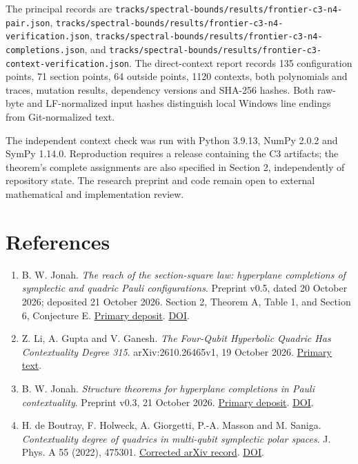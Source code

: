 \documentclass[11pt,letterpaper]{article}
\providecommand{\tightlist}{\setlength{\itemsep}{0pt}\setlength{\parskip}{0pt}}
\begin{document}
The principal records are \nolinkurl{tracks/spectral-bounds/results/frontier-c3-n4-pair.json}, \nolinkurl{tracks/spectral-bounds/results/frontier-c3-n4-verification.json}, \nolinkurl{tracks/spectral-bounds/results/frontier-c3-n4-completions.json}, and \nolinkurl{tracks/spectral-bounds/results/frontier-c3-context-verification.json}. The direct-context report records 135 configuration points, 71 section points, 64 outside points, 1120 contexts, both polynomials and traces, mutation results, dependency versions and SHA-256 hashes. Both raw-byte and LF-normalized input hashes distinguish local Windows line endings from Git-normalized text.

The independent context check was run with Python 3.9.13, NumPy 2.0.2 and SymPy 1.14.0. Reproduction requires a release containing the C3 artifacts; the theorem's complete assignments are also specified in Section 2, independently of repository state. The research preprint and code remain open to external mathematical and implementation review.

\section{References}\label{references}

\begin{enumerate}
\def\labelenumi{\arabic{enumi}.}
\tightlist
\item
  B. W. Jonah. \emph{The reach of the section-square law: hyperplane completions of symplectic and quadric Pauli configurations}. Preprint v0.5, dated 20 October 2026; deposited 21 October 2026. Section 2, Theorem A, Table 1, and Section 6, Conjecture E. \href{https://zenodo.org/records/23524332}{Primary deposit}. \href{https://doi.org/10.5281/zenodo.23524332}{DOI}.
\item
  Z. Li, A. Gupta and V. Ganesh. \emph{The Four-Qubit Hyperbolic Quadric Has Contextuality Degree 315}. arXiv:2610.26465v1, 19 October 2026. \href{https://arxiv.org/html/2610.26465v1}{Primary text}.
\item
  B. W. Jonah. \emph{Structure theorems for hyperplane completions in Pauli contextuality}. Preprint v0.3, 21 October 2026. \href{https://zenodo.org/records/23538829}{Primary deposit}. \href{https://doi.org/10.5281/zenodo.23538829}{DOI}.
\item
  H. de Boutray, F. Holweck, A. Giorgetti, P.-A. Masson and M. Saniga. \emph{Contextuality degree of quadrics in multi-qubit symplectic polar spaces}. J. Phys. A 55 (2022), 475301. \href{https://arxiv.org/abs/2105.13798}{Corrected arXiv record}. \href{https://doi.org/10.1088/1751-8121/aca36f}{DOI}.
\end{enumerate}
\end{document}

